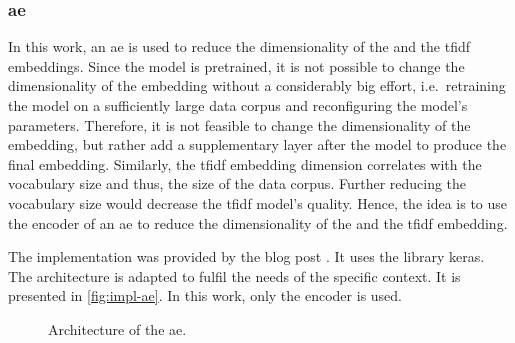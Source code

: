 \subsubsection*{\acl{ae}}\label{subsubsec:impl-autoencoder}

In this work, an \ac{ae} is used to reduce the dimensionality of the \infersent{} and the \ac{tfidf} embeddings.
Since the \infersent{} model is pretrained, it is not possible to change the dimensionality of the embedding without a considerably big effort,
i.e.\ retraining the model on a sufficiently large data corpus and reconfiguring the model's parameters.
Therefore, it is not feasible to change the dimensionality of the \infersent{} embedding, but rather add a supplementary layer after the model 
to produce the final embedding.
Similarly, the \ac{tfidf} embedding dimension correlates with the vocabulary size and thus, the size of the data corpus.
Further reducing the vocabulary size would decrease the \ac{tfidf} model's quality.
Hence, the idea is to use the encoder of an \ac{ae} to reduce the dimensionality of the \infersent{} and the \ac{tfidf} embedding.

The implementation was provided by the blog post \cite{impl-src-ae}.
It uses the library keras.
The architecture is adapted to fulfil the needs of the specific context.
It is presented in \autoref{fig:impl-ae}.
In this work, only the encoder is used.
%     

\begin{figure}[!htb] %
    \centering
    
    \caption[Architecture of the \ac{ae}]{Architecture of the \ac{ae}.}
    \label{fig:impl-ae}
\end{figure}